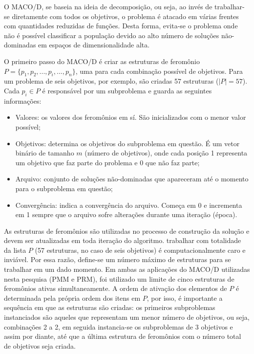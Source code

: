 O MACO/D, se baseia na ideia de decomposição, ou seja, ao invés de trabalhar-se diretamente com todos os objetivos, o problema é atacado em várias frentes com quantidades reduzidas de funções. Desta forma, evita-se o problema onde não é possível classificar a população devido ao alto número de soluções não-dominadas em espaços de dimensionalidade alta.

O primeiro passo do MACO/D é criar as estruturas de feromônio $P = \{p_1, p_2, ..., p_i, ..., p_n\}$, uma para cada combinação possível de objetivos. Para um problema de seis objetivos, por exemplo, são criadas 57 estruturas ($|P| = 57$). Cada $p_i \in P$ é responsável por um subproblema e guarda as seguintes informações:

\begin{itemize}
	\item Valores: os valores dos feromônios em sí. São inicializados com o menor valor possível;
	\item Objetivos: determina os objetivos do subproblema em questão. É um vetor binário de tamanho $m$ (número de objetivos), onde cada posição 1 representa um objetivo que faz parte do problema e 0 que não faz parte;
	\item Arquivo: conjunto de soluções não-dominadas que apareceram até o momento para o subproblema em questão;
	\item Convergência: indica a convergência do arquivo. Começa em 0 e incrementa em 1 sempre que o arquivo sofre alterações durante uma iteração (época).
\end{itemize}

As estruturas de feromônios são utilizadas no processo de construção da solução e devem ser atualizadas em toda iteração do algoritmo. trabalhar com totalidade da lista $P$ (57 estruturas, no caso de seis objetivos) é computacionalmente caro e inviável. Por essa razão, define-se um número máximo de estruturas para se trabalhar em um dado momento. Em ambas as aplicações do MACO/D utilizadas nesta pesquisa (PMM e PRM), foi utilizado um limite de cinco estruturas de feromônios ativas simultaneamente. A ordem de ativação dos elementos de $P$ é determinada pela própria ordem dos itens em $P$, por isso, é importante a sequência em que as estruturas são criadas: os primeiros subproblemas instanciados são aqueles que representam um menor número de  objetivos, ou seja, combinações 2 a 2, em seguida instancia-se os subproblemas de 3 objetivos e assim por diante, até que a última estrutura de feromônios com o número total de objetivos seja criada.

